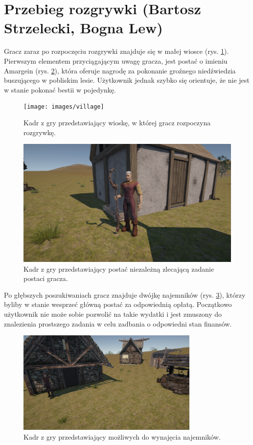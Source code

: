 \section{Przebieg rozgrywki (Bartosz Strzelecki, Bogna Lew)}
Gracz zaraz po rozpoczęciu rozgrywki znajduje się w małej wiosce (rys. \ref{fig:village}). Pierwszym
elementem przyciągającym uwagę gracza, jest postać o imieniu Amargein (rys. \ref{fig:npc}), która oferuje
nagrodę za pokonanie groźnego niedźwiedzia buszującego w pobliskim lesie. Użytkownik jednak
szybko się orientuje, że nie jest w stanie pokonać bestii w pojedynkę.

\begin{figure}[h]
\centering
\texttt{[image: images/village]}
\caption{Kadr z gry przedstawiający wioskę, w której gracz rozpoczyna rozgrywkę.}
\label{fig:village}
\end{figure}
\FloatBarrier

\begin{figure}[h]
\centering
\includegraphics[width=1\textwidth]{images/npc1}
\caption{Kadr z gry przedstawiający postać niezależną zlecającą zadanie postaci gracza.}
\label{fig:npc}
\end{figure}
\FloatBarrier

Po głębszych poszukiwaniach gracz znajduje dwójkę najemników (rys. \ref{fig:mercs}), którzy byliby w stanie
wesprzeć główną postać za odpowiednią opłatą. Początkowo użytkownik nie może sobie
pozwolić na takie wydatki i jest zmuszony do znalezienia prostszego zadania
w celu zadbania o odpowiedni stan finansów.

\begin{figure}[h]
\centering
\includegraphics[width=0.8\textwidth]{images/mercs}
\caption{Kadr z gry przedstawiający możliwych do wynajęcia najemników.}
\label{fig:mercs}
\end{figure}
\FloatBarrier


